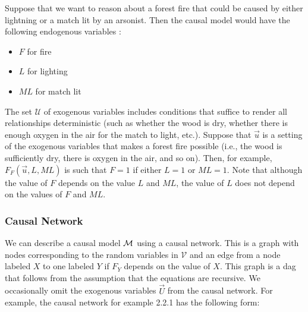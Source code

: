 \begin{example}
    Suppose that we want to reason about a forest fire that could
    be caused by either lightning or a match lit by an arsonist.
    Then the causal model would have the following endogenous variables :
    \begin{itemize}
        \item $F$ for fire
        \item $L$ for lighting
        \item $ML$ for match lit
    \end{itemize}
    The set $\mathcal{U}$ of exogenous variables includes conditions
    that suffice to render all relationships deterministic (such as
    whether the wood is dry, whether there is enough oxygen in the air
    for the match to light, etc.).
    Suppose that $\vec u$ is a setting of the exogenous variables that
    makes a forest fire possible (i.e., the wood is sufficiently dry,
    there is oxygen in the air, and so on).
    Then, for example, $F_F(\vec u, L, ML)$ is such that $F=1$ if either
    $L=1$ or $ML=1$.
    Note that although the value of $F$ depends on the value $L$ and $ML$, the value of $L$ does not depend on the values of $F$ and $ML$.
\end{example}

\subsubsection{Causal Network}
We can describe a causal model $\mathcal{M}$ using a causal network.
This is a graph with nodes corresponding to the random variables
in $\mathcal{V}$ and an edge from a node labeled $X$ to one
labeled $Y$ if $F_Y$ depends on the value of $X$.
This graph is a dag that follows from the assumption that the
equations are recursive.
We occasionally omit the exogenous variables $\vec U$ from the causal network.
For example, the causal network for example 2.2.1 has the following
form:

\begin{center}
\end{center}

